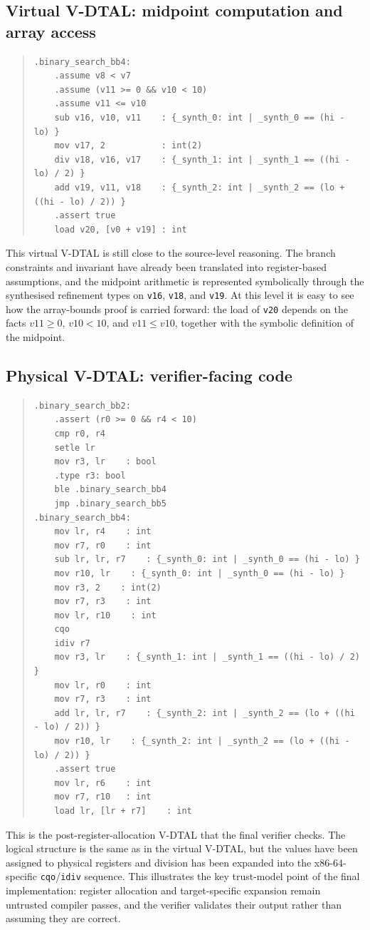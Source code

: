 \subsection{Virtual V-DTAL: midpoint computation and array access}
%
\begin{quote}
\begin{verbatim}
.binary_search_bb4:
    .assume v8 < v7
    .assume (v11 >= 0 && v10 < 10)
    .assume v11 <= v10
    sub v16, v10, v11    : {_synth_0: int | _synth_0 == (hi - lo) }
    mov v17, 2           : int(2)
    div v18, v16, v17    : {_synth_1: int | _synth_1 == ((hi - lo) / 2) }
    add v19, v11, v18    : {_synth_2: int | _synth_2 == (lo + ((hi - lo) / 2)) }
    .assert true
    load v20, [v0 + v19] : int
\end{verbatim}
\end{quote}
%
This virtual V-DTAL is still close to the source-level reasoning. The branch constraints and invariant have already been translated into register-based assumptions, and the midpoint arithmetic is represented symbolically through the synthesised refinement types on \texttt{v16}, \texttt{v18}, and \texttt{v19}. At this level it is easy to see how the array-bounds proof is carried forward: the load of \texttt{v20} depends on the facts $v11 \ge 0$, $v10 < 10$, and $v11 \le v10$, together with the symbolic definition of the midpoint.
%
\subsection{Physical V-DTAL: verifier-facing code}
%
\begin{quote}
\begin{verbatim}
.binary_search_bb2:
    .assert (r0 >= 0 && r4 < 10)
    cmp r0, r4
    setle lr
    mov r3, lr    : bool
    .type r3: bool
    ble .binary_search_bb4
    jmp .binary_search_bb5
.binary_search_bb4:
    mov lr, r4    : int
    mov r7, r0    : int
    sub lr, lr, r7    : {_synth_0: int | _synth_0 == (hi - lo) }
    mov r10, lr    : {_synth_0: int | _synth_0 == (hi - lo) }
    mov r3, 2    : int(2)
    mov r7, r3    : int
    mov lr, r10    : int
    cqo
    idiv r7
    mov r3, lr    : {_synth_1: int | _synth_1 == ((hi - lo) / 2) }
    mov lr, r0    : int
    mov r7, r3    : int
    add lr, lr, r7    : {_synth_2: int | _synth_2 == (lo + ((hi - lo) / 2)) }
    mov r10, lr    : {_synth_2: int | _synth_2 == (lo + ((hi - lo) / 2)) }
    .assert true
    mov lr, r6    : int
    mov r7, r10   : int
    load lr, [lr + r7]    : int
\end{verbatim}
\end{quote}
%
This is the post-register-allocation V-DTAL that the final verifier checks. The logical structure is the same as in the virtual V-DTAL, but the values have been assigned to physical registers and division has been expanded into the x86-64-specific \texttt{cqo}/\texttt{idiv} sequence. This illustrates the key trust-model point of the final implementation: register allocation and target-specific expansion remain untrusted compiler passes, and the verifier validates their output rather than assuming they are correct.

